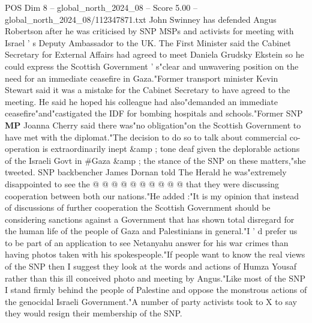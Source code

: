 \begin{textsample}{POS Dim 8 – global\_north\_2024\_08 – Score 5.00 – global\_north\_2024\_08/112347871.txt}  \label{ex:f8_pos_322}
John Swinney has defended Angus Robertson after he was criticised by SNP MSPs and activists for meeting with Israel ' s Deputy Ambassador to the UK.
The First Minister said the Cabinet Secretary for External Affairs had agreed to meet Daniela Grudsky Ekstein so he could express the Scottish Government ' s"clear and unwavering position on the need for an immediate ceasefire in Gaza."Former transport minister Kevin Stewart said it was a mistake for the Cabinet Secretary to have agreed to the meeting.
He said he hoped his colleague had also"demanded an immediate ceasefire"and"castigated the IDF for bombing hospitals and schools."Former SNP \textbf{MP} Joanna Cherry said there was"no obligation"on the Scottish Government to have met with the diplomat."The decision to do so to talk about commercial co-operation is extraordinarily inept \&amp ; tone deaf given the deplorable actions of the Israeli Govt in \#Gaza \&amp ; the stance of the SNP on these matters,"she tweeted.
SNP backbencher James Dornan told The Herald he was"extremely disappointed to see the @ @ @ @ @ @ @ @ @ @ that they were discussing cooperation between both our nations."He added :"It is my opinion that instead of discussions of further cooperation the Scottish Government should be considering sanctions against a Government that has shown total disregard for the human life of the people of Gaza and Palestinians in general."I ' d prefer us to be part of an application to see Netanyahu answer for his war crimes than having photos taken with his spokespeople."If people want to know the real views of the SNP then I suggest they look at the words and actions of Humza Yousaf rather than this ill conceived photo and meeting by Angus."Like most of the SNP I stand firmly behind the people of Palestine and oppose the monstrous actions of the genocidal Israeli Government."A number of party activists took to X to say they would resign their membership of the SNP.

\end{textsample}

